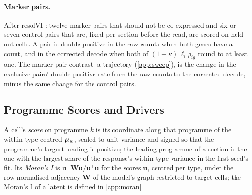\paragraph{Marker pairs.} After resolVI \citep{ergen2025}: twelve marker pairs that should not be co-expressed and six or seven control pairs that are, fixed per section before the read, are scored on held-out cells. A pair is double positive in the raw counts when both genes have a count, and in the corrected decode when both of $(1-\kappa)\,\ell_i\rho_{ig}$ round to at least one. The marker-pair contrast, a trajectory (\cref{app:sweep}), is the change in the exclusive pairs' double-positive rate from the raw counts to the corrected decode, minus the same change for the control pairs.

\subsection{Programme Scores and Drivers}
\label{app:S-drivers}

A cell's \emph{score} on programme $k$ is its coordinate along that programme of the within-type-centred $\boldsymbol{\mu}_w$, scaled to unit variance and signed so that the programme's largest loading is positive; the leading programme of a section is the one with the largest share of the response's within-type variance in the first seed's fit. Its \emph{Moran's I} is $\mathbf{u}^\top \mathbf{W}\mathbf{u} / \mathbf{u}^\top\mathbf{u}$ for the scores $\mathbf{u}$, centred per type, under the row-normalised adjacency $\mathbf{W}$ of the model's graph restricted to target cells; the Moran's I of a latent is defined in \cref{app:moran}.

